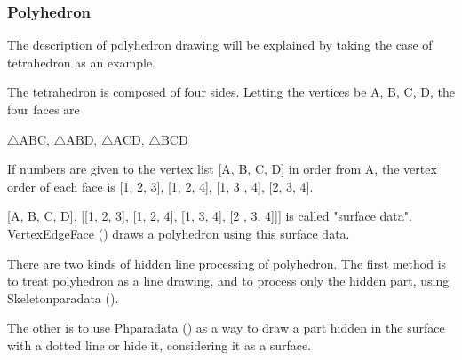 \documentclass[papersize,a4paper,12pt]{article}
\begin{document}
\subsubsection{Polyhedron}

 The description of polyhedron drawing will be explained by taking the case of tetrahedron as an example.

The tetrahedron is composed of four sides. Letting the vertices be A, B, C, D, the four faces are 

\hspace{20mm}$\triangle\mathrm{ABC}$, $\triangle\mathrm{ABD}$, $\triangle\mathrm{ACD}$, $\triangle\mathrm{BCD}$

\begin{center}  \end{center}

If numbers are given to the vertex list [A, B, C, D] in order from A, the vertex order of each face is [1, 2, 3], [1, 2, 4], [1, 3 , 4], [2, 3, 4].

[A, B, C, D], [[1, 2, 3], [1, 2, 4], [1, 3, 4], [2 , 3, 4]]] is called "surface data". VertexEdgeFace () draws a polyhedron using this surface data.

There are two kinds of hidden line processing of polyhedron. The first method is to treat polyhedron as a line drawing, and to process only the hidden part, using Skeletonparadata ().

The other is to use Phparadata () as a way to draw a part hidden in the surface with a dotted line or hide it, considering it as a surface.

\vspace{\baselineskip}
\end{document}
